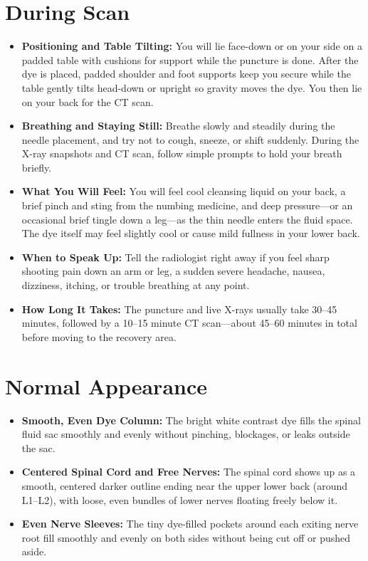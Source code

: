\section{During Scan}
\begin{itemize}
    \item \textbf{Positioning and Table Tilting:} You will lie face-down or on your side on a padded table with cushions for support while the puncture is done. After the dye is placed, padded shoulder and foot supports keep you secure while the table gently tilts head-down or upright so gravity moves the dye. You then lie on your back for the CT scan.
    \item \textbf{Breathing and Staying Still:} Breathe slowly and steadily during the needle placement, and try not to cough, sneeze, or shift suddenly. During the X-ray snapshots and CT scan, follow simple prompts to hold your breath briefly.
    \item \textbf{What You Will Feel:} You will feel cool cleansing liquid on your back, a brief pinch and sting from the numbing medicine, and deep pressure---or an occasional brief tingle down a leg---as the thin needle enters the fluid space. The dye itself may feel slightly cool or cause mild fullness in your lower back.
    \item \textbf{When to Speak Up:} Tell the radiologist right away if you feel sharp shooting pain down an arm or leg, a sudden severe headache, nausea, dizziness, itching, or trouble breathing at any point.
    \item \textbf{How Long It Takes:} The puncture and live X-rays usually take 30--45 minutes, followed by a 10--15 minute CT scan---about 45--60 minutes in total before moving to the recovery area.
\end{itemize}

\section{Normal Appearance}
\begin{itemize}
    \item \textbf{Smooth, Even Dye Column:} The bright white contrast dye fills the spinal fluid sac smoothly and evenly without pinching, blockages, or leaks outside the sac.
    \item \textbf{Centered Spinal Cord and Free Nerves:} The spinal cord shows up as a smooth, centered darker outline ending near the upper lower back (around L1--L2), with loose, even bundles of lower nerves floating freely below it.
    \item \textbf{Even Nerve Sleeves:} The tiny dye-filled pockets around each exiting nerve root fill smoothly and evenly on both sides without being cut off or pushed aside.
\end{itemize}

